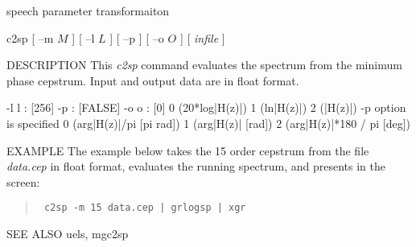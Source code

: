 {speech parameter transformaiton}

\begin{synopsis}
\item[c2sp] [ --m $M$ ] [ --l $L$ ] [ --p ] [ --o $O$ ] [ {\em infile} ]
\end{synopsis}

\begin{qsection}{DESCRIPTION}
This {\em c2sp} command evaluates the spectrum from the minimum phase
 cepstrum.
 Input and output data are in float format.
\end{qsection}

\begin{options}
       -l l  :          [256]
       -p    :          [FALSE]
       -o o  :         [0]
                0 (20*log|H(z)|)
                1 (ln|H(z)|)
                2 (|H(z)|)
               -p option is specified
                0 (arg|H(z)|/pi       [pi rad])
                1 (arg|H(z)|          [rad])
                2 (arg|H(z)|*180 / pi [deg])
\end{options}

\begin{qsection}{EXAMPLE}
The example below takes the 15 order cepstrum from the file
 {\em data.cep} in float format, evaluates the running spectrum,
 and presents in the screen:
\begin{quote}
 \verb! c2sp -m 15 data.cep | grlogsp | xgr ! 
\end{quote}
\end{qsection}

\begin{qsection}{SEE ALSO}
uels, mgc2sp
\end{qsection}

